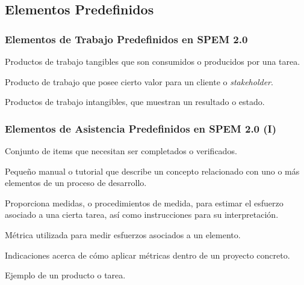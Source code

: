 \documentclass[a4paper,t]{beamer}
\begin{document}
\subsection{Elementos Predefinidos}

\begin{frame}[c]
    \frametitle{Elementos de Trabajo Predefinidos en SPEM 2.0}
    \begin{description}[<+->]
        \item[Artifacts] Productos de trabajo tangibles que son consumidos o producidos por una tarea.
        \item[Deliverable] Producto de trabajo que posee cierto valor para un cliente o \emph{stakeholder}.
        \item[Outcome] Productos de trabajo intangibles, que muestran un resultado o estado.
    \end{description}
\end{frame}

\begin{frame}[c]
    \frametitle{Elementos de Asistencia Predefinidos en SPEM 2.0 (I)}
    \begin{description}[<+->]
        \item[Checklist] Conjunto de items que necesitan ser completados o verificados.
        \item[Concept] Pequeño manual o tutorial que describe un concepto relacionado con uno o más elementos de un proceso de desarrollo.
        \item[Estimate] Proporciona medidas, o procedimientos de medida, para estimar el esfuerzo asociado a una cierta tarea, así como instrucciones para su interpretación.
        \item[Estimating Metric] Métrica utilizada para medir esfuerzos asociados a un elemento.
        \item[Estimation Considerations] Indicaciones acerca de cómo aplicar métricas dentro de un proyecto concreto.
        \item[Example] Ejemplo de un producto o tarea.
    \end{description}
\end{frame}
\end{document}
